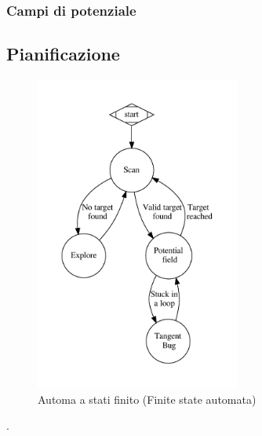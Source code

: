 \documentclass[a4paper]{article}
\begin{document}
	\subsubsection{Campi di potenziale}
	
	
	\subsection{Pianificazione}\label{subsec:Pianificazione}
	\begin{figure}[H]
		\centering
		\includegraphics[width=0.6\textwidth]{./img/fsa.pdf}
		\caption{Automa a stati finito (Finite state automata)}
		\label{fig:fsa}
	\end{figure}
	
	\newpage
	
	.
\end{document}
